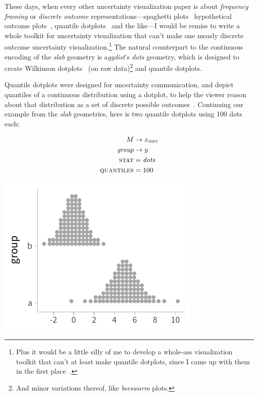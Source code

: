 \documentclass[journal]{vgtc}                     %
\begin{document}
These days, when every other uncertainty visualization paper is about \textit{frequency framing} or \textit{discrete outcome} representations---spaghetti plots~\cite{cox2013visualizing,liu2018visualizing} hypothetical outcome plots~\cite{hullman2015hypothetical,kale2018hypothetical}, quantile dotplots~\cite{kay2016ish,fernandes2018uncertainty} and the like---I would be remiss to write a whole toolkit for uncertainty visualization that can't make one measly discrete outcome uncertainty visualization.\footnote{Plus it would be a little silly of me to develop a whole-ass visualization toolkit that can't at least make quantile dotplots, since I came up with them in the first place~\cite{kay2016ish}.} The natural counterpart to the continuous encoding of the \textit{slab} geometry is a\textit{ggdist}'s \textit{dots} geometry, which is designed to create Wilkinson dotplots~\cite{wilkinson1999dot} (on raw data)\footnote{And minor variations thereof, like \textit{beeswarm} plots.} and quantile dotplots.

Quantile dotplots were designed for uncertainty communication, and depict quantiles of a continuous distribution using a dotplot, to help the viewer reason about that distribution as a set of discrete possible outcomes~\cite{kay2016ish}. Continuing our example from the \textit{slab} geometries, here is two quantile dotplots using 100 dots each:

\noindent
\begin{minipage}{.5\columnwidth}

\begin{align*}
M &\rightarrow x_\textsc{dist}\\
\textit{group} &\rightarrow y\\
\textsc{stat} &= \mathit{dots}\\
\textsc{quantiles} &= 100
\end{align*}
\end{minipage}%
  \begin{minipage}{.4\columnwidth}
    \centering
    \includegraphics[width=1.2\columnwidth]{figs/3-dots_two.pdf}
  \end{minipage}
\hfill\break
\end{document}
